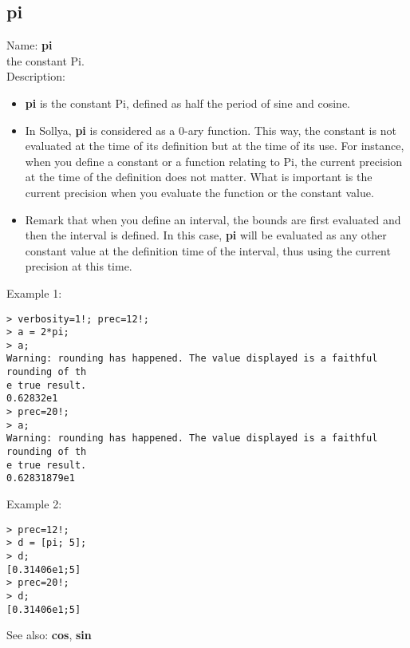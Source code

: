 \subsection{ pi }
\noindent Name: \textbf{pi}\\
the constant Pi.\\

\noindent Description: \begin{itemize}

\item \textbf{pi} is the constant Pi, defined as half the period of sine and cosine.

\item In Sollya, \textbf{pi} is considered as a 0-ary function. This way, the constant 
   is not evaluated at the time of its definition but at the time of its use. For 
   instance, when you define a constant or a function relating to Pi, the current
   precision at the time of the definition does not matter. What is important is 
   the current precision when you evaluate the function or the constant value.

\item Remark that when you define an interval, the bounds are first evaluated and 
   then the interval is defined. In this case, \textbf{pi} will be evaluated as any 
   other constant value at the definition time of the interval, thus using the 
   current precision at this time.
\end{itemize}
\noindent Example 1: 
\begin{center}\begin{minipage}{15cm}\begin{Verbatim}[frame=single]
> verbosity=1!; prec=12!;
> a = 2*pi;
> a;
Warning: rounding has happened. The value displayed is a faithful rounding of th
e true result.
0.62832e1
> prec=20!;
> a;
Warning: rounding has happened. The value displayed is a faithful rounding of th
e true result.
0.62831879e1
\end{Verbatim}
\end{minipage}\end{center}
\noindent Example 2: 
\begin{center}\begin{minipage}{15cm}\begin{Verbatim}[frame=single]
> prec=12!;
> d = [pi; 5];
> d;
[0.31406e1;5]
> prec=20!;
> d;
[0.31406e1;5]
\end{Verbatim}
\end{minipage}\end{center}
See also: \textbf{cos}, \textbf{sin}
